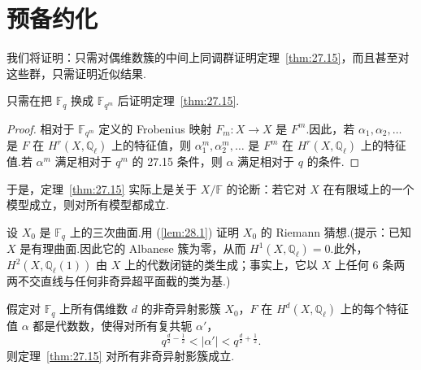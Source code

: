 ﻿%
\chapter{预备约化}\label{sec:28}

我们将证明：只需对偶维数簇的中间上同调群证明定理~\ref{thm:27.15}，而且甚至对这些群，只需证明近似结果.

\begin{lemma}\label{lem:28.1}
只需在把 $\mathbb{F}_q$ 换成 $\mathbb{F}_{q^m}$ 后证明定理~\ref{thm:27.15}.
\end{lemma}

\begin{proof}
相对于 $\mathbb{F}_{q^m}$ 定义的 Frobenius 映射 $F_m \colon X \to X$ 是 $F^{m}$.因此，若 $\alpha_1, \alpha_2, \ldots$ 是 $F$ 在 $H^{r}(X, \mathbb{Q}_{\ell})$ 上的特征值，则 $\alpha^{m}_1, \alpha^{m}_2, \ldots$ 是 $F^{m}$ 在 $H^{r}(X, \mathbb{Q}_{\ell})$ 上的特征值.若 $\alpha^{m}$ 满足相对于 $q^{m}$ 的 27.15 条件，则 $\alpha$ 满足相对于 $q$ 的条件.
\end{proof}

于是，定理~\ref{thm:27.15} 实际上是关于 $X/\mathbb{F}$ 的论断：若它对 $X$ 在有限域上的一个模型成立，则对所有模型都成立.

\begin{exercise}\label{exc:28.2}
设 $X_0$ 是 $\mathbb{F}_q$ 上的三次曲面.用 (\ref{lem:28.1}) 证明 $X_0$ 的 Riemann 猜想.(提示：已知 $X$ 是有理曲面.因此它的 Albanese 簇为零，从而 $H^{1}(X, \mathbb{Q}_{\ell}) = 0$.此外，$H^{2}(X, \mathbb{Q}_{\ell}(1))$ 由 $X$ 上的代数闭链的类生成；事实上，它以 $X$ 上任何 6 条两两不交直线与任何非奇异超平面截的类为基.)
\end{exercise}

\begin{proposition}\label{prop:28.3}
假定对 $\mathbb{F}_q$ 上所有偶维数 $d$ 的非奇异射影簇 $X_0$，$F$ 在 $H^{d}(X, \mathbb{Q}_{\ell})$ 上的每个特征值 $\alpha$ 都是代数数，使得对所有复共轭 $\alpha'$，
\[
q^{\frac{d}{2} - \frac{1}{2}} < |\alpha'| < q^{\frac{d}{2} + \frac{1}{2}}.
\]
则定理~\ref{thm:27.15} 对所有非奇异射影簇成立.
\end{proposition}

